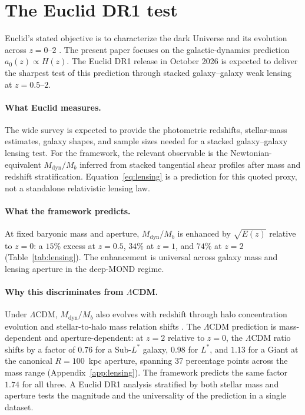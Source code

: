 \documentclass[11pt,a4paper]{article}
\numberwithin{equation}{section}
\numberwithin{table}{section}
\numberwithin{figure}{section}
\newcommand{\afid}{a_0}
\newcommand{\Mb}{M_b}
\newcommand{\Mdyn}{M_\text{dyn}}
\newcommand{\Ez}{E(z)}
\begin{document}
\newpage

\section{The Euclid DR1 test}
\label{sec:euclid}

Euclid's stated objective is to characterize the dark Universe and its
evolution across $z = 0$--$2$ \citep{Euclid2024}. The present paper
focuses on the galactic-dynamics prediction
$\afid(z) \propto H(z)$. The Euclid DR1 release in October 2026 is
expected to deliver the sharpest test of this prediction through
stacked galaxy--galaxy weak lensing at $z = 0.5$--$2$.

\paragraph{What Euclid measures.}
The wide survey is expected to provide the photometric redshifts,
stellar-mass estimates, galaxy shapes, and sample sizes needed for a
stacked galaxy--galaxy lensing test. For the framework, the relevant
observable is the Newtonian-equivalent $\Mdyn/\Mb$ inferred from
stacked tangential shear profiles after mass and redshift
stratification. Equation~\eqref{eq:lensing} is a prediction for this
quoted proxy, not a standalone relativistic lensing law.

\paragraph{What the framework predicts.}
At fixed baryonic mass and aperture, $\Mdyn/\Mb$ is enhanced by
$\sqrt{\Ez}$ relative to $z = 0$: a $15\%$ excess at $z = 0.5$, $34\%$
at $z = 1$, and $74\%$ at $z = 2$ (Table~\ref{tab:lensing}). The
enhancement is universal across galaxy mass and lensing aperture in the
deep-MOND regime.

\paragraph{Why this discriminates from $\Lambda$CDM.}
Under $\Lambda$CDM, $\Mdyn/\Mb$ also evolves with redshift through halo
concentration evolution and stellar-to-halo mass relation shifts
\citep{Moster2013,Duffy2008}. The $\Lambda$CDM prediction is
mass-dependent and aperture-dependent: at $z = 2$ relative to $z = 0$,
the $\Lambda$CDM ratio shifts by a factor of $0.76$ for a Sub-$L^*$
galaxy, $0.98$ for $L^*$, and $1.13$ for a Giant at the canonical
$R = 100$~kpc aperture, spanning 37 percentage points across the mass
range (Appendix~\ref{app:lensing}). The framework predicts the same
factor $1.74$ for all three. A Euclid DR1 analysis stratified by both
stellar mass and aperture tests the magnitude and the universality of
the prediction in a single dataset.
\end{document}

